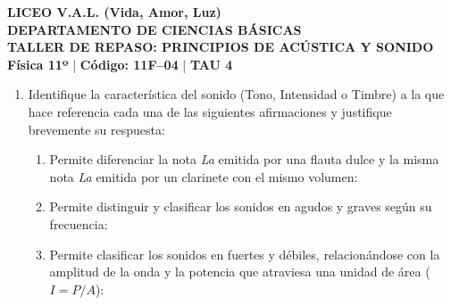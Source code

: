 \documentclass[11pt, letterpaper]{article}
\newif\ifshowanswers
\newcommand{\answer}[1]{%
	\ifshowanswers
	\par\vspace{0.15cm}
	\begin{tcolorbox}[colback=blue!5!white, colframe=blue!60!white, arc=1mm, boxrule=0.5pt, title=\textbf{\footnotesize SOLUCIÓN PASO A PASO (DOCENTE)}]
		\color{blue!80!black}\footnotesize #1
	\end{tcolorbox}
	\par\vspace{0.15cm}
	\else
	\par\vspace{0.3cm}
	\fi
}
\begin{document}
	
	\begin{center}
		{\Large \textbf{\color{valblue} LICEO V.A.L. (Vida, Amor, Luz)}}\\[0.1cm]
		{\large \textbf{DEPARTAMENTO DE CIENCIAS BÁSICAS}}\\[0.1cm]
		{\large \textbf{TALLER DE REPASO: PRINCIPIOS DE ACÚSTICA Y SONIDO}}\\[0.1cm]
		{\small \textbf{Física 11º} \quad | \quad \textbf{Código: 11F--04 } \quad | \quad \textbf{TAU 4} }
	\end{center}
	

	
	\vspace{0.3cm}
	
	\begin{enumerate}[leftmargin=*, itemsep=0.8cm]
		
		\item  Identifique la característica del sonido (Tono, Intensidad o Timbre) a la que hace referencia cada una de las siguientes afirmaciones y justifique brevemente su respuesta:
		\begin{enumerate}[label=\alph*), itemsep=0.2cm]
			\item Permite diferenciar la nota \textit{La} emitida por una flauta dulce y la misma nota \textit{La} emitida por un clarinete con el mismo volumen: \underline{\hspace{5cm}}
			\item Permite distinguir y clasificar los sonidos en agudos y graves según su frecuencia: \underline{\hspace{5cm}}
			\item Permite clasificar los sonidos en fuertes y débiles, relacionándose con la amplitud de la onda y la potencia que atraviesa una unidad de área ($I = P/A$): \underline{\hspace{5cm}}
		\end{enumerate}
		\answer{
			\textbf{a) Timbre:} El timbre permite distinguir dos sonidos que tienen el mismo tono (frecuencia) y la misma intensidad (volumen) pero son emitidos por fuentes o instrumentos diferentes, ya que depende de la forma de la onda y los armónicos que acompañan a la frecuencia fundamental.\\
			\textbf{b) Tono:} El tono es la característica por la cual distinguimos sonidos graves y agudos, y está determinado por la frecuencia de la onda (si la frecuencia es alta el tono es agudo, y si es baja el tono es grave).\\
			\textbf{c) Intensidad:} La intensidad clasifica los sonidos en fuertes y débiles (``volumen''), depende de la amplitud de la onda y equivale a la potencia acústica por unidad de área ($I = P/A$).
		}
		

\end{enumerate}
\end{document}
